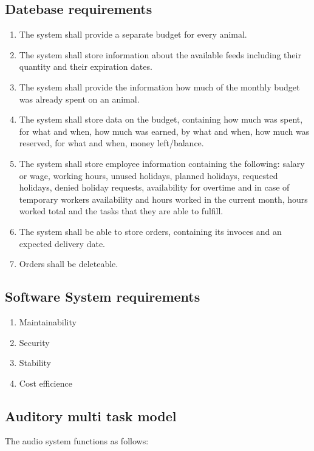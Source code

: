\subsection{Datebase requirements}
\begin{enumerate}[1.]
		\item The system shall provide a separate budget for every animal.
		\item The system shall store information about the available feeds including their quantity and their expiration dates.
		\item The system shall provide the information how much of the monthly budget was already spent on an animal.
		\item The system shall store data on the budget, containing how much was spent, for what and when, how much was earned, by what and when, how much was reserved, for what and when, money left/balance.
		\item The system shall store employee information containing the following: salary or wage, working hours, unused holidays, planned holidays, requested holidays, denied holiday requests, availability for overtime and in case of temporary workers availability and hours worked in the current month, hours worked total and the tasks that they are able to fulfill.
		\item The system shall be able to store orders, containing its invoces and an expected delivery date.
		\item Orders shall be deleteable.
\end{enumerate}
\subsection{Software System requirements}
\begin{enumerate}[1.]
		\item Maintainability
		\item Security
		\item Stability
		\item Cost efficience
\end{enumerate}


\subsection{Auditory multi task model}

The audio system functions as follows:


